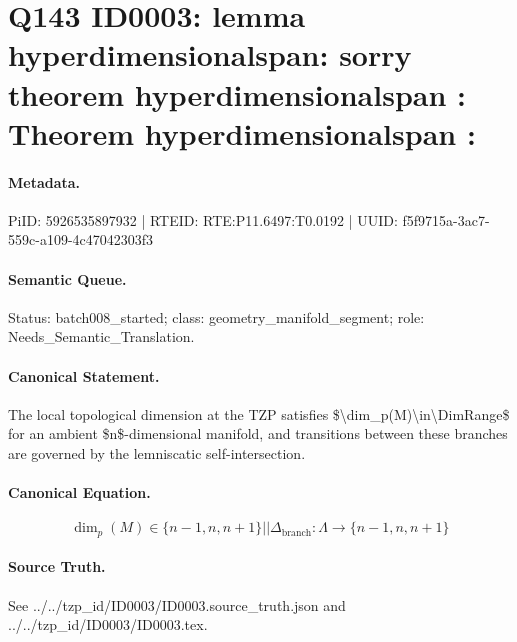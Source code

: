 \section*{Q143 ID0003: lemma hyperdimensionalspan: sorry theorem hyperdimensionalspan : Theorem hyperdimensionalspan :}
\paragraph{Metadata.}
PiID: 5926535897932 | RTEID: RTE:P11.6497:T0.0192 | UUID: f5f9715a-3ac7-559c-a109-4c47042303f3

\paragraph{Semantic Queue.}
Status: batch008\_started; class: geometry\_manifold\_segment; role: Needs\_Semantic\_Translation.

\paragraph{Canonical Statement.}
The local topological dimension at the TZP satisfies \$\textbackslash{}dim\_p(M)\textbackslash{}in\textbackslash{}DimRange\$ for an ambient \$n\$-dimensional manifold, and transitions between these branches are governed by the lemniscatic self-intersection.

\paragraph{Canonical Equation.}
\[
\dim_{p}(M) \in \{n-1,n,n+1\} || \Delta_{\mathrm{branch}} : \Lambda \longrightarrow \{n-1,n,n+1\}
\]

\paragraph{Source Truth.}
See ../../tzp\_id/ID0003/ID0003.source\_truth.json and ../../tzp\_id/ID0003/ID0003.tex.
